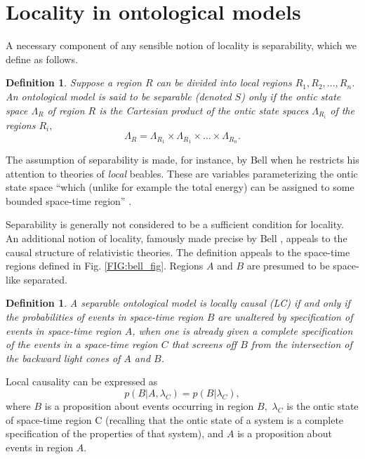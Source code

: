 \documentclass[aps,nofootinbib,12pt]{revtex4}
\newtheorem{definition}[theorem]{Definition}
\begin{document}
\section{Locality in ontological models \label{SEC:locality}}

A necessary component of any sensible notion of locality is
separability, which we define as follows.
\begin{definition}
Suppose a region $R$ can be divided into local regions $R_{1},R_{2},...,R_{n}%
$. An ontological model is said to be \emph{separable} (denoted $S$) only if
the ontic state space $\Lambda_{R}$ of region $R$ is the Cartesian product of
the ontic state spaces $\Lambda_{R_{i}}$ of the regions $R_{i},$%
\[
\Lambda_{R}=\Lambda_{R_{1}}\times\Lambda_{R_{1}}\times\dots\times
\Lambda_{R_{n}}.
\]
\label{DEF:separable}
\end{definition}
The assumption of separability is made, for instance, by Bell when
he restricts his attention to theories of \textit{local} beables.
These are variables parameterizing the ontic state space ``which
(unlike for example the total energy) can be assigned to some
bounded space-time region'' \cite{bell_quoteonseparability}.

Separability is generally not considered to be a sufficient
condition for locality. An additional notion of locality, famously
made precise by Bell \cite{Bell_cuisine,bell_beables}, appeals to
the causal structure of relativistic theories.  The definition
appeals to the space-time regions defined in Fig.
\ref{FIG:bell_fig}.  Regions $A$ and $B$ are presumed to be
space-like separated.
\begin{definition}
A separable ontological model is \emph{locally causal} (LC) if and
only if the probabilities of events in space-time region $B$ are
unaltered by specification of events in space-time region $A$, when
one is already given a complete specification of the events in a
space-time region $C$ that screens off $B$ from the intersection of
the backward light cones of $A$ and $B$.
\label{DEF:locally_causal}
\end{definition}
Local causality can be expressed as
\begin{equation}
p(B|A,\lambda_{C})=p(B|\lambda_{C}),
\end{equation}
where $B$ is a proposition about events occurring in region $B,$
$\lambda _{C}$ is the ontic state of space-time region C (recalling
that the ontic state of a system is a complete specification of the
properties of that system), and $A$ is a proposition about events in
region $A$.
\end{document}
